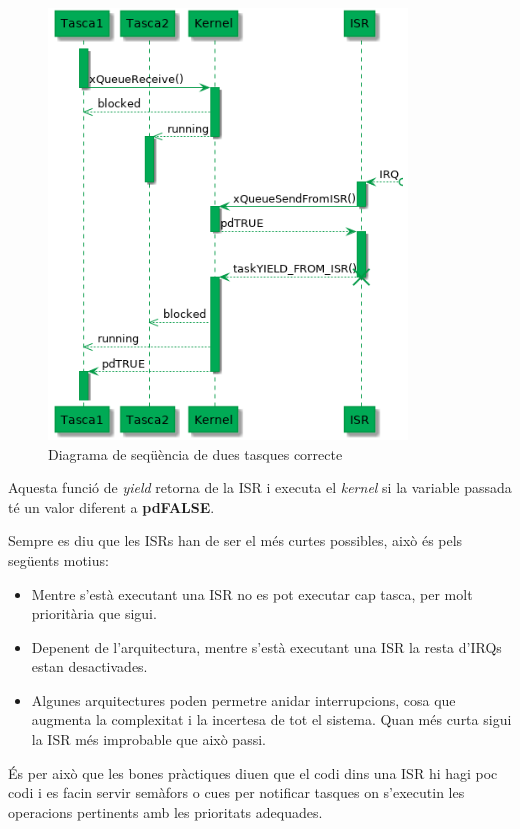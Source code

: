 \begin{figure}
 \centering
 \includegraphics[width=0.85\textwidth, keepaspectratio]{imatges/FreeRTOSISRYield.png}
 \caption{Diagrama de seqüència de dues tasques correcte}
 \label{fig:FreeRTOSISRYield}
\end{figure}

Aquesta funció de {\em yield} retorna de la ISR i executa el {\em kernel} si la variable passada té un valor diferent a {\bf pdFALSE}.

Sempre es diu que les \glspl{ISR} han de ser el més curtes possibles, això és pels següents motius:
\begin{itemize}
 \item Mentre s'està executant una \gls{ISR} no es pot executar cap tasca, per molt prioritària que sigui.
 \item Depenent de l'arquitectura, mentre s'està executant una ISR la resta d'\glspl{IRQ} estan desactivades.
 \item Algunes arquitectures poden permetre anidar interrupcions, cosa que augmenta la complexitat i la incertesa de tot el sistema. Quan més curta sigui la ISR més improbable que això passi.
\end{itemize}

És per això que les bones pràctiques diuen que el codi dins una \gls{ISR} hi hagi poc codi i es facin servir semàfors o cues per notificar tasques on s'executin les operacions pertinents amb les prioritats adequades.

